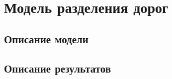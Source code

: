 \section{Модель разделения дорог}

\subsection{Описание модели}

\subsection{Описание результатов}

\clearpage